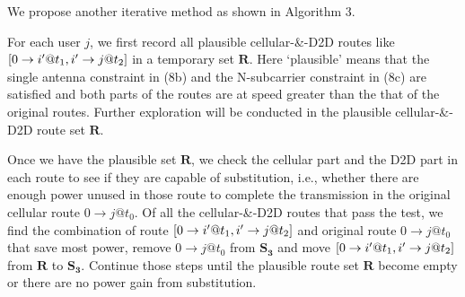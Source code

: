 \documentclass{ieeeaccess}
\begin{document}
We propose another iterative method as shown in Algorithm 3. 


For each user $j$, we first record all plausible cellular-\&-D2D routes like $\left[ {{\rm{0}} \to i'@{t_1},i' \to j@{t_2}} \right]$ in a temporary set $\mathbf{R}$. Here `plausible' means that the single antenna constraint in (8b) and the N-subcarrier constraint in (8c) are satisfied and both parts of the routes are at speed greater than the that of the original routes. Further exploration will be conducted in the plausible cellular-\&-D2D route set $\mathbf{R}$.

Once we have the plausible set $\mathbf{R}$, we check the cellular part and the D2D part in each route to see if they are capable of substitution, i.e., whether there are enough power unused in those route to complete the transmission in the original cellular route $0 \to j @{t_0}$. Of all the cellular-\&-D2D routes that pass the test, we find the combination of route $\left[ {{\rm{0}} \to i'@{t_1},i' \to j@{t_2}} \right]$ and original route $0 \to j @{t_0}$ that save most power, remove $0 \to j @{t_0}$ from ${{\mathbf{S}}_{\mathbf{3}}}$ and move $\left[ {{\rm{0}} \to i'@{t_1},i' \to j@{t_2}} \right]$ from $\mathbf{R}$ to ${{\mathbf{S}}_{\mathbf{3}}}$. Continue those steps until the plausible route set $\mathbf{R}$ become empty or there are no power gain from substitution.
\end{document}

